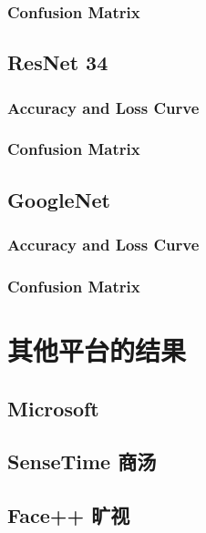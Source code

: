 \documentclass[11pt, a4paper]{article}
\begin{document}
\begin{CJK}{UTF8}{gbsn}
\subsubsection{Confusion Matrix}

\subsection{ResNet 34}

\subsubsection{Accuracy and Loss Curve}

\subsubsection{Confusion Matrix}

\subsection{GoogleNet}

\subsubsection{Accuracy and Loss Curve}

\subsubsection{Confusion Matrix}

\section{其他平台的结果}

\subsection{Microsoft}

\subsection{SenseTime 商汤}

\subsection{Face++ 旷视}

\end{CJK}









  
 





\end{document}
